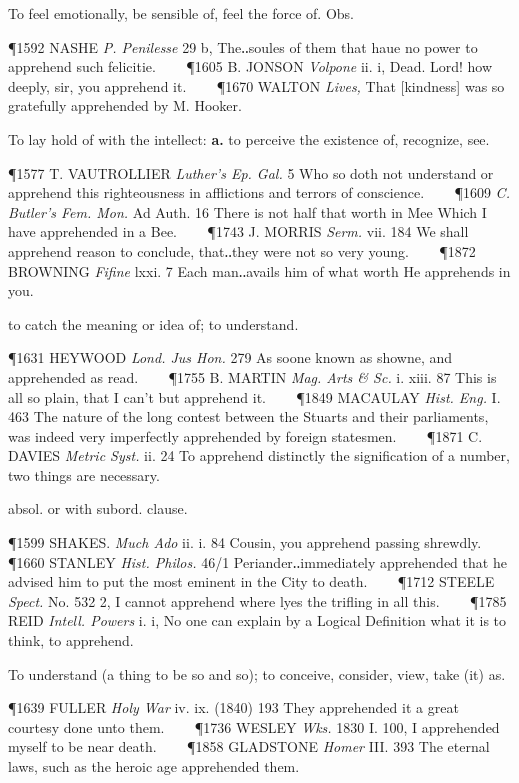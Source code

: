 \begin{description}[wide, labelwidth=!, labelindent=0pt]
\begin{myenumerate}
 To feel emotionally, be sensible of, feel the force of. Obs.

\P 1592 NASHE  \textit{P. Penilesse} 29 b, The‥soules of them that haue no power to apprehend such felicitie.    
\P 1605 B. JONSON  \textit{Volpone} ii. i, Dead. Lord! how deeply, sir, you apprehend it.    
\P 1670 WALTON  \textit{Lives,} That [kindness] was so gratefully apprehended by M. Hooker.

 To lay hold of with the intellect: \textbf{a.} to perceive the existence of, recognize, see.

\P 1577 T. VAUTROLLIER  \textit{Luther's Ep. Gal.} 5 Who so doth not understand or apprehend this righteousness in afflictions and terrors of conscience.    
\P 1609 \textit{C. Butler's Fem. Mon.} Ad Auth. 16 There is not half that worth in Mee Which I have apprehended in a Bee.    
\P 1743 J. MORRIS  \textit{Serm.} vii. 184 We shall apprehend reason to conclude, that‥they were not so very young.    
\P 1872 BROWNING  \textit{Fifine} lxxi. 7 Each man‥avails him of what worth He apprehends in you.

 to catch the meaning or idea of; to understand.

\P 1631 HEYWOOD  \textit{Lond. Jus Hon.} 279 As soone known as showne, and apprehended as read.    
\P 1755 B. MARTIN  \textit{Mag. Arts \& Sc.} i. xiii. 87 This is all so plain, that I can't but apprehend it.    
\P 1849 MACAULAY  \textit{Hist. Eng.} I. 463 The nature of the long contest between the Stuarts and their parliaments, was indeed very imperfectly apprehended by foreign statesmen.    
\P 1871 C. DAVIES  \textit{Metric Syst.} ii. 24 To apprehend distinctly the signification of a number, two things are necessary.

 absol. or with subord. clause.

\P 1599 SHAKES.  \textit{Much Ado} ii. i. 84 Cousin, you apprehend passing shrewdly.    
\P 1660 STANLEY  \textit{Hist. Philos.} 46/1 Periander‥immediately apprehended that he advised him to put the most eminent in the City to death.    
\P 1712 STEELE  \textit{Spect.} No. 532 2, I cannot apprehend where lyes the trifling in all this.    
\P 1785 REID  \textit{Intell. Powers} i. i, No one can explain by a Logical Definition what it is to think, to apprehend.

 To understand (a thing to be so and so); to conceive, consider, view, take (it) as.

\P 1639 FULLER  \textit{Holy War} iv. ix. (1840) 193 They apprehended it a great courtesy done unto them.    
\P 1736 WESLEY \textit{Wks.} 1830 I. 100, I apprehended myself to be near death.    
\P 1858 GLADSTONE  \textit{Homer} III. 393 The eternal laws, such as the heroic age apprehended them.


\end{myenumerate}
\end{description}
